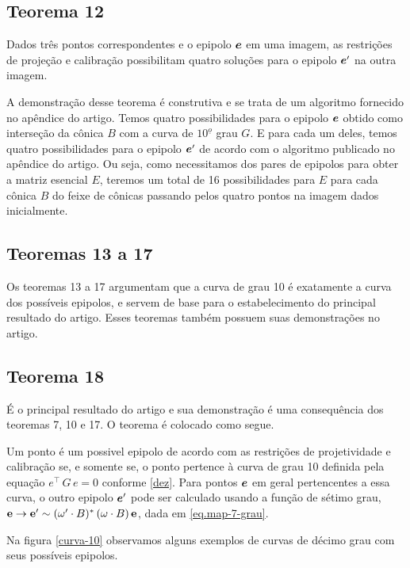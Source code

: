 \subsection*{Teorema 12}
\begin{teorema}
Dados três pontos correspondentes e o epipolo $\boldsymbol{e}$
em uma imagem, as restrições de projeção e calibração possibilitam quatro soluções para o epipolo $\boldsymbol{e}'$ na outra imagem.
\end{teorema}
A demonstração desse teorema é construtiva e se trata de um algoritmo fornecido no apêndice do artigo. Temos quatro possibilidades para o epipolo $\boldsymbol{e}$ obtido como interseção da cônica $B$ com a curva de $10^{\underline{o}}$ grau $G$. E para cada um deles, temos quatro possibilidades para o epipolo $\boldsymbol{e}'$ de acordo com o algoritmo publicado no apêndice do artigo. Ou seja, como necessitamos dos pares de epipolos para obter a matriz esencial $E$, teremos um total de 16 possibilidades para $E$ para cada cônica $B$ do feixe de cônicas passando pelos quatro pontos na imagem dados inicialmente. 


\subsection*{Teoremas 13 a 17}
Os teoremas 13 a 17 argumentam que a curva de grau 10 é exatamente a curva dos possíveis epipolos, e servem de base para o estabelecimento do principal resultado do artigo. Esses teoremas também possuem suas demonstrações no artigo.  

\subsection*{Teorema 18}
É o principal resultado do artigo e sua demonstração é uma consequência dos teoremas 7, 10 e 17. O teorema é colocado como segue.

\begin{teorema}
Um ponto é um possivel epipolo de acordo com as restrições de projetividade e calibração se, e somente se, o ponto pertence à curva de grau 10 definida pela equação $e^\top\,G\,e=0$ conforme \ref{dez}. Para pontos $\boldsymbol{e}$ em geral pertencentes a essa curva, o outro epipolo $\boldsymbol{e}'$ pode ser calculado usando a função de sétimo grau, ${\bf e} \rightarrow {\bf e'} \sim (\omega' \cdot B)^*\,(\omega \cdot B)\,{\bf e}
$, dada em \ref{eq.map-7-grau}.
\end{teorema}

Na figura \ref{curva-10} observamos alguns exemplos de curvas de décimo grau com seus possíveis epipolos. 

